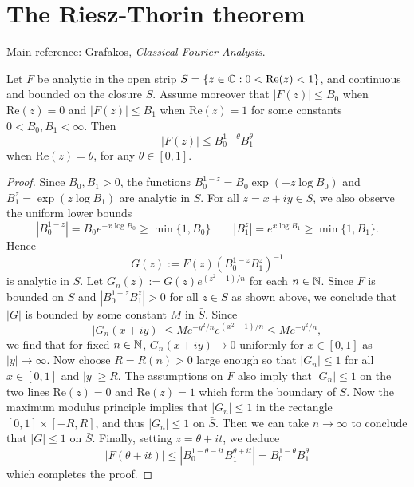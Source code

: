 \section{The Riesz-Thorin theorem}
Main reference: Grafakos, \emph{Classical Fourier Analysis}.

\begin{lemma}
\label{lem:three-lines}
Let $F$ be analytic in the open strip $S=\{z\in\mathbb{C}:0<\mathrm{Re}(z)<1\}$, and continuous and bounded on the closure $\bar{S}$. Assume moreover that $|F(z)|\le B_0$ when $\mathrm{Re}(z)=0$ and $|F(z)|\le B_1$ when $\mathrm{Re} (z)=1$ for some constants $0<B_0,B_1<\infty$. Then
\begin{equation*}
    |F(z)| \le B_0^{1-\theta}B_1^\theta
\end{equation*}
when $\mathrm{Re}(z)=\theta$, for any $\theta\in [0,1]$.
\end{lemma}
\begin{proof}
Since $B_0, B_1>0$, the functions $B_0^{1-z}=B_0\exp(-z\log B_0)$ and $B_1^z=\exp(z\log B_1)$ are analytic in $S$. For all $z=x+iy\in \bar{S}$, we also observe the uniform lower bounds
\begin{equation*}
    |B_0^{1-z}| = B_0 e^{-x\log B_0} \ge \min\{1,B_0\} \qquad |B_1^z| = e^{x\log B_1} \ge \min\{1,B_1\}.
\end{equation*}
Hence
\begin{equation*}
    G(z):=F(z)(B_0^{1-z}B_1^z)^{-1}
\end{equation*}
is analytic in $S$. Let $G_n(z):=G(z)e^{(z^2-1)/n}$ for each $n\in\mathbb{N}$. Since $F$ is bounded on $\bar{S}$ and $|B_0^{1-z}B_1^z| > 0$ for all $z\in\bar{S}$ as shown above, we conclude that $|G|$ is bounded by some constant $M$ in $\bar{S}$. Since
\begin{equation*}
    |G_n(x+iy)| \le Me^{-y^2/n}e^{(x^2-1)/n} \le Me^{-y^2/n},
\end{equation*}
we find that for fixed $n\in\mathbb{N}$, $G_n(x+iy) \to 0$ uniformly for $x\in [0,1]$ as $|y|\to \infty$. Now choose $R=R(n)>0$ large enough so that $|G_n|\le 1$ for all $x\in [0,1]$ and $|y|\ge R$. The assumptions on $F$ also imply that $|G_n|\le 1$ on the two lines $\mathrm{Re}(z)=0$ and $\mathrm{Re}(z)=1$ which form the boundary of $S$. Now the maximum modulus principle implies that $|G_n|\le 1$ in the rectangle $[0,1]\times [-R,R]$, and thus $|G_n|\le 1$ on $\bar{S}$. Then we can take $n\to\infty$ to conclude that $|G|\le 1$ on $\bar{S}$. Finally, setting $z=\theta+it$, we deduce
\begin{equation*}
    |F(\theta+it)| \le |B_0^{1-\theta-it}B_1^{\theta+it}|=B_0^{1-\theta}B_1^\theta
\end{equation*}
which completes the proof.
\end{proof}

